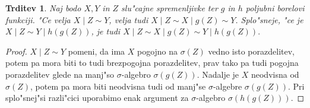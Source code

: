 \documentclass[12pt, a4paper, reqno]{amsart}
\theoremstyle{definition}
\newtheorem{definicija}{Definicija}[section]
\theoremstyle{plain}
\newtheorem{trditev}[definicija]{Trditev}
\newcommand{\Prob}{\mathbb{P}}
\newcommand{\1}{\mathds{1}}
\begin{document}

%

    \begin{trditev}
        Naj bodo $X, Y$ in $Z$ slu"cajne spremenljivke ter $g$ in $h$ poljubni borelovi funkciji. 
        "Ce velja $X\mid Z\sim Y$, velja tudi $X\mid Z\sim X\mid g(Z)\sim Y$. Splo"sneje, 
        "ce je $X\mid Z \sim Y\mid h(g(Z))$, je tudi $X\mid Z\sim X\mid g(Z) \sim Y\mid h(g(Z)).$
        \label{trd:pogojneLastnosti}
    \end{trditev}

    \begin{proof}
        $X\mid Z\sim Y$ pomeni, da ima $X$ pogojno na $\sigma(Z)$ vedno isto porazdelitev, potem pa mora
        biti to tudi brezpogojna porazdelitev, prav tako pa tudi pogojna porazdelitev glede
        na manj"so $\sigma$-algebro $\sigma(g(Z))$. Nadalje je $X$ neodvisna od $\sigma(Z)$, potem pa 
        mora biti neodvisna tudi od manj"se $\sigma$-algebre $\sigma(g(Z))$. Pri splo"snej"si razli"cici 
        uporabimo enak argument za $\sigma$-algebro $\sigma(h(g(Z)))$.
        
    \end{proof}
\end{document}
